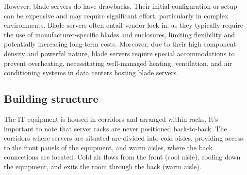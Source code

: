 However, blade servers do have drawbacks. 
Their initial configuration or setup can be expensive and may require significant effort, particularly in complex environments. 
Blade servers often entail vendor lock-in, as they typically require the use of manufacturer-specific blades and enclosures, limiting flexibility and potentially increasing long-term costs. 
Moreover, due to their high component density and powerful nature, blade servers require special accommodations to prevent overheating, necessitating well-managed heating, ventilation, and air conditioning systems in data centers hosting blade servers.

\subsection{Building structure}
The IT equipment is housed in corridors and arranged within racks. 
It's important to note that server racks are never positioned back-to-back. 
The corridors where servers are situated are divided into cold aisles, providing access to the front panels of the equipment, and warm aisles, where the back connections are located.
Cold air flows from the front (cool aisle), cooling down the equipment, and exits the room through the back (warm aisle).